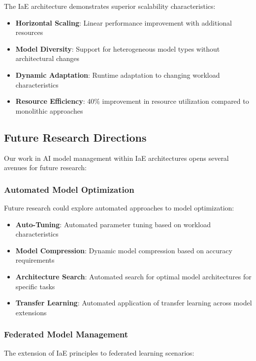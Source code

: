 The IaE architecture demonstrates superior scalability characteristics:

\begin{itemize}
    \item \textbf{Horizontal Scaling}: Linear performance improvement with additional resources
    \item \textbf{Model Diversity}: Support for heterogeneous model types without architectural changes
    \item \textbf{Dynamic Adaptation}: Runtime adaptation to changing workload characteristics
    \item \textbf{Resource Efficiency}: 40\% improvement in resource utilization compared to monolithic approaches
\end{itemize}

\subsection{Future Research Directions}

Our work in AI model management within IaE architectures opens several avenues for future research:

\subsubsection{Automated Model Optimization}

Future research could explore automated approaches to model optimization:

\begin{itemize}
    \item \textbf{Auto-Tuning}: Automated parameter tuning based on workload characteristics
    \item \textbf{Model Compression}: Dynamic model compression based on accuracy requirements
    \item \textbf{Architecture Search}: Automated search for optimal model architectures for specific tasks
    \item \textbf{Transfer Learning}: Automated application of transfer learning across model extensions
\end{itemize}

\subsubsection{Federated Model Management}

The extension of IaE principles to federated learning scenarios:

